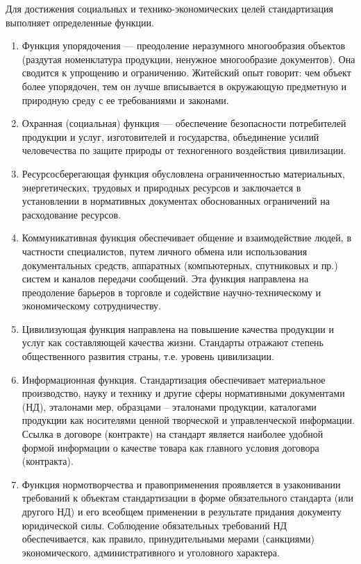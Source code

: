 Для достижения социальных и технико-экономических целей стандартизация выполняет определенные функции.
\begin{enumerate}
\item Функция упорядочения --- преодоление неразумного многообразия объектов (раздутая номенклатура продукции, ненужное многообразие документов). Она сводится к упрощению и ограничению. Житейский опыт говорит: чем объект более упорядочен, тем он лучше вписывается в окружающую предметную и природную среду с ее требованиями и законами.
\item Охранная (социальная) функция --- обеспечение безопасности потребителей продукции и услуг, изготовителей и государства, объединение усилий человечества по защите природы от техногенного воздействия цивилизации.
\item Ресурсосберегающая функция обусловлена ограниченностью материальных, энергетических, трудовых и природных ресурсов и заключается в установлении в нормативных документах обоснованных ограничений на расходование ресурсов.
\item Коммуникативная функция обеспечивает общение и взаимодействие людей, в частности специалистов, путем личного обмена или использования документальных средств, аппаратных (компьютерных, спутниковых и пр.) систем и каналов передачи сообщений. Эта функция направлена на преодоление барьеров в торговле и содействие научно-техническому и экономическому сотрудничеству.
\item Цивилизующая функция направлена на повышение качества продукции и услуг как составляющей качества жизни. Стандарты отражают степень общественного развития страны, т.е. уровень цивилизации.
\item Информационная функция. Стандартизация обеспечивает материальное производство, науку и технику и другие сферы нормативными документами (НД), эталонами мер, образцами – эталонами продукции, каталогами продукции как носителями ценной творческой и управленческой информации. Ссылка в договоре (контракте) на стандарт является наиболее удобной формой информации о качестве товара как главного условия договора (контракта).
\item Функция нормотворчества и правоприменения проявляется в узаконивании требований к объектам стандартизации в форме обязательного стандарта (или другого НД) и его всеобщем применении в результате придания документу юридической силы. Соблюдение обязательных требований НД обеспечивается, как правило, принудительными мерами (санкциями) экономического, административного и уголовного характера.
\end{enumerate}

